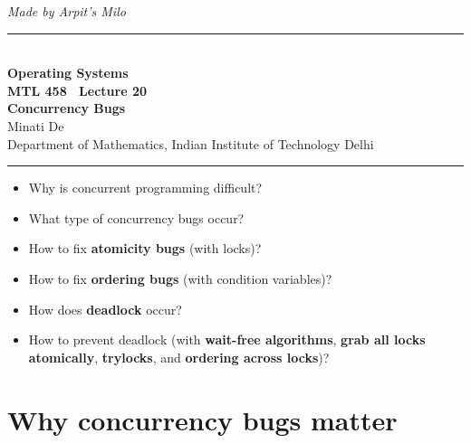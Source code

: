 \documentclass[11pt,a4paper]{article}
\begin{document}
\begin{center}
{\small\itshape Made by Arpit's Milo}\\[0.3em]
{\color{rulegray}\rule{\textwidth}{1.1pt}}\\[0.45em]
{\LARGE\bfseries Operating Systems}\\[0.25em]
{\Large\bfseries MTL 458 \textperiodcentered\ Lecture 20}\\[0.35em]
{\LARGE\bfseries Concurrency Bugs}\\[0.35em]
{\large Minati De}\\[0.15em]
{\normalsize Department of Mathematics, Indian Institute of Technology Delhi}\\[0.35em]
{\color{rulegray}\rule{\textwidth}{1.1pt}}
\end{center}

\vspace{0.4em}
\begin{keybox}
\begin{itemize}
  \item Why is concurrent programming difficult?
  \item What type of concurrency bugs occur?
  \item How to fix \textbf{atomicity bugs} (with locks)?
  \item How to fix \textbf{ordering bugs} (with condition variables)?
  \item How does \textbf{deadlock} occur?
  \item How to prevent deadlock (with \textbf{wait-free algorithms}, \textbf{grab
        all locks atomically}, \textbf{trylocks}, and \textbf{ordering across
        locks})?
\end{itemize}
\end{keybox}

\tableofcontents
\vspace{0.6em}
\noindent{\color{rulegray}\rule{\textwidth}{0.4pt}}

\section{Why concurrency bugs matter}
\end{document}
